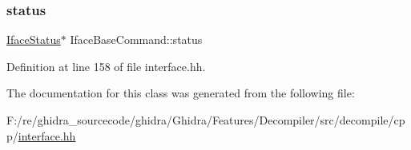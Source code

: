 \subsubsection{\texorpdfstring{status}{status}}
{\footnotesize\ttfamily \mbox{\hyperlink{class_iface_status}{Iface\+Status}}$\ast$ Iface\+Base\+Command\+::status\hspace{0.3cm}{\ttfamily [protected]}}



Definition at line 158 of file interface.\+hh.



The documentation for this class was generated from the following file\+:\begin{DoxyCompactItemize}
\item 
F\+:/re/ghidra\+\_\+sourcecode/ghidra/\+Ghidra/\+Features/\+Decompiler/src/decompile/cpp/\mbox{\hyperlink{interface_8hh}{interface.\+hh}}\end{DoxyCompactItemize}
